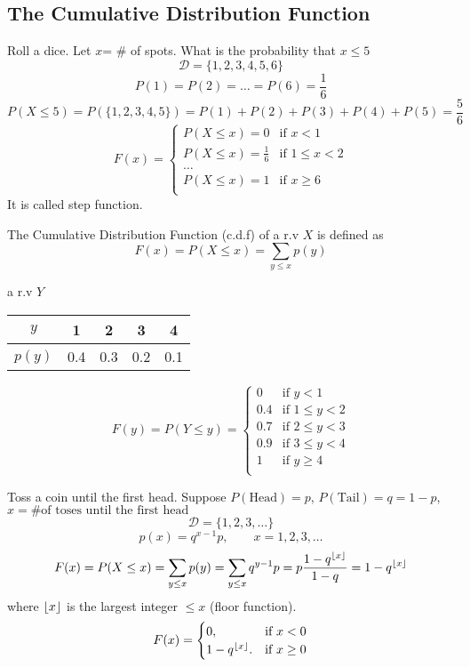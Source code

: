 \subsection{The Cumulative Distribution Function}
\begin{exmp}
Roll a dice. Let $x$= \# of spots. What is the probability that $x \leq 5$
\[	\mathcal{D}=\{1,2,3,4,5,6\}		\]
\[	P(1)=P(2)=\dots=P(6)=\frac{1}{6}		\]
\[	P(X \leq 5)=P(\{1,2,3,4,5\})=P(1)+P(2)+P(3)+P(4)+P(5)=\frac{5}{6}	\]
\[F(x)=\begin{cases}
P(X \leq x)=0 &\text{if } x < 1 \\
P(X \leq x)=\frac{1}{6} &\text{if } 1 \leq x < 2 \\
\dots \\
P(X \leq x)=1 &\text{if } x \geq 6 \\
\end{cases}\]
It is called step function.
\end{exmp}

\begin{defn}
The Cumulative Distribution Function (c.d.f) of a r.v $X$ is defined as 
\[	F(x)=P(X\leq x)=\sum_{y\leq x}p(y) \]
\end{defn}

\begin{exmp}
a r.v $Y$

\begin{center}
\begin{tabular}{c|cccc}
\hline
$y$  & 1 & 2 & 3 & 4\\
\hline
$p(y)$  & 0.4 & 0.3  & 0.2  & 0.1 \\
\hline
\end{tabular}
\end{center}


\[F(y)=P(Y\leq y)=\begin{cases}
0 &\text{if } y < 1 \\
0.4 &\text{if } 1 \leq y < 2 \\
0.7 &\text{if } 2 \leq y < 3 \\
0.9 &\text{if } 3 \leq y < 4 \\
1 &\text{if } y \geq 4 \\
\end{cases}
\]
\end{exmp}

\begin{exmp}
Toss a coin until the first head. Suppose $P(\text{Head})=p$, $P(\text{Tail})=q=1-p$, $x=\text{\# of toses until the first head}$
\[\mathcal{D}=\{1,2,3,\dots\}\]
\[p(x)=q^{x-1}p, \qquad x=1,2,3,\dots\]
\[F(x)=P(X \leq x)=\sum_{y \leq x}p(y)=\sum_{y \leq x}q^{y-1}p=p \frac{1-q^{\floor*{x}}}{1-q}=1-q^{\floor*{x}}\]
where $\floor*{x}$ is the largest integer $\leq x$ (floor function).
\[F(x)=\begin{cases}
0, & \text{if } x <0 \\
1-q^{\floor*{x}}. &\text{if } x\geq 0\\
\end{cases}\] 
\end{exmp}

